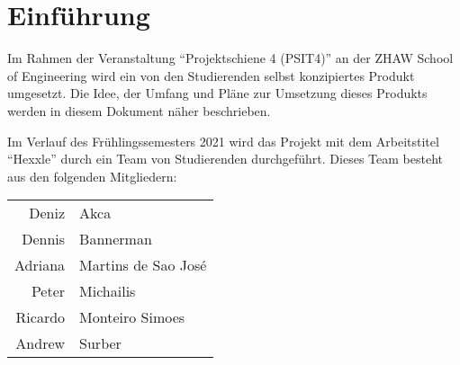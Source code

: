 \documentclass[../main.tex]{subfiles}
\begin{document}
	\section{Einführung}
	\par Im Rahmen der Veranstaltung \enquote{Projektschiene 4 (PSIT4)} an der ZHAW School of Engineering wird ein von den Studierenden selbst konzipiertes Produkt umgesetzt. Die Idee, der Umfang und Pläne zur Umsetzung dieses Produkts werden in diesem Dokument näher beschrieben.
	\par Im Verlauf des Frühlingssemesters 2021 wird das Projekt mit dem Arbeitstitel \enquote{Hexxle}  durch ein Team von Studierenden durchgeführt. Dieses Team besteht aus den folgenden Mitgliedern:
	\begin{table}[H]
		\centering
		\begin{tabular}{rl}
			Deniz   & Akca                \\
			Dennis  & Bannerman           \\
			Adriana & Martins de Sao José \\
			Peter   & Michailis           \\
			Ricardo & Monteiro Simoes     \\
			Andrew  & Surber             
		\end{tabular}
	\end{table}
	
\end{document}

